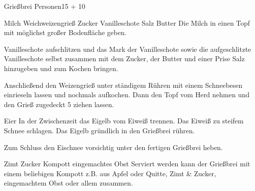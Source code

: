\begin{MyRecipe}{Grießbrei}{ Personen}{\SI{15}{\minuteprime} + \SI{10}{\minuteprime}}
	
	\ingredient[\Calc{0.8}{\x}]{\si{\liter}} {Milch}
	\ingredient[\Calc{80}{\x}]{\si{\gram}} {Weichweizengrieß}
	\ingredient[\Calc{2}{\x}]{\si{\Essloeffel}} {Zucker}
	\ingredient[\Calc{1}{\x}]{} {Vanilleschote}
	\ingredient[\Calc{1}{\x}]{\si{\Prise}} {Salz}
	\ingredient[\Calc{25}{\x}]{\si{\gram}} {Butter}
	Die Milch in einen Topf mit möglichst großer Bodenfläche geben.
	
	Vanilleschote aufschlitzen und das Mark der Vanilleschote sowie die aufgeschlitzte Vanilleschote selbst zusammen mit dem Zucker, der Butter und einer Prise Salz hinzugeben und zum Kochen bringen.
	
	Anschließend den Weizengrieß unter ständigem Rühren mit einem Schneebesen einrieseln lassen und nochmals aufkochen. Dann den Topf vom Herd nehmen und den Grieß zugedeckt \SI{5}{\minuteprime} ziehen lassen.\par\bigskip
	
	\ingredient[\Calc{1}{\x}]{} {Eier}
	In der Zwischenzeit das Eigelb vom Eiweiß trennen. Das Eiweiß zu steifem Schnee schlagen. Das Eigelb gründlich in den Grießbrei rühren.
	
	Zum Schluss den Eischnee vorsichtig unter den fertigen Grießbrei heben.\par\bigskip
	
	\ingredient[]{} {Zimt}
	\ingredient[]{} {Zucker}
	\ingredient[]{} {Kompott}
	\ingredient[]{} {eingemachtes Obst}
	Serviert werden kann der Grießbrei mit einem beliebigen Kompott z.B. aus Apfel oder Quitte, Zimt \& Zucker, eingemachtem Obst oder allem zusammen.
	
\end{MyRecipe}